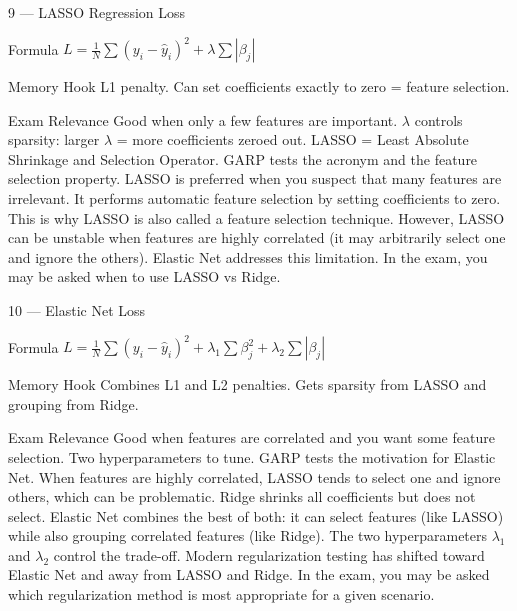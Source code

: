 \documentclass[aspectratio=169,8pt]{beamer}
\begin{document}
	\begin{frame}{9 --- LASSO Regression Loss}
		\begin{block}{Formula}
			$L = \frac{1}{N}\sum(y_i - \hat{y}_i)^2 + \lambda\sum|\beta_j|$
		\end{block}
		\begin{block}{Memory Hook}
			L1 penalty. Can set coefficients exactly to zero = feature selection.
		\end{block}
		\begin{block}{Exam Relevance}
			Good when only a few features are important. $\lambda$ controls sparsity: larger $\lambda$ = more coefficients zeroed out. LASSO = Least Absolute Shrinkage and Selection Operator. GARP tests the acronym and the feature selection property. LASSO is preferred when you suspect that many features are irrelevant. It performs automatic feature selection by setting coefficients to zero. This is why LASSO is also called a feature selection technique. However, LASSO can be unstable when features are highly correlated (it may arbitrarily select one and ignore the others). Elastic Net addresses this limitation. In the exam, you may be asked when to use LASSO vs Ridge.
		\end{block}
	\end{frame}
	
	\begin{frame}{10 --- Elastic Net Loss}
		\begin{block}{Formula}
			$L = \frac{1}{N}\sum(y_i - \hat{y}_i)^2 + \lambda_1\sum\beta_j^2 + \lambda_2\sum|\beta_j|$
		\end{block}
		\begin{block}{Memory Hook}
			Combines L1 and L2 penalties. Gets sparsity from LASSO and grouping from Ridge.
		\end{block}
		\begin{block}{Exam Relevance}
			Good when features are correlated and you want some feature selection. Two hyperparameters to tune. GARP tests the motivation for Elastic Net. When features are highly correlated, LASSO tends to select one and ignore others, which can be problematic. Ridge shrinks all coefficients but does not select. Elastic Net combines the best of both: it can select features (like LASSO) while also grouping correlated features (like Ridge). The two hyperparameters $\lambda_1$ and $\lambda_2$ control the trade-off. Modern regularization testing has shifted toward Elastic Net and away from LASSO and Ridge. In the exam, you may be asked which regularization method is most appropriate for a given scenario.
		\end{block}
	\end{frame}
	
\end{document}
